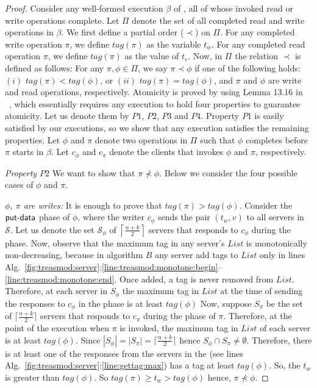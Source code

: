 			\begin{proof}
Consider any well-formed execution $\beta$ of \treasmod, all of whose invoked read or write operations complete. Let $\Pi$ denote the set of all completed read and write operations in $\beta$. We first define a partial order ($\prec$) on $\Pi$. 
For any completed write operation $\pi$, we define $tag(\pi)$ as the variable  $t_w$. For any completed read operation $\pi$, we define $tag(\pi)$ as the value of $t_r$. 
Now, in $\Pi$ the relation $\prec$ is defined as follows: For any $\pi, \phi \in \Pi$, we say $\pi \prec \phi$  if 
one of the following holds: $(i)$  $tag(\pi)  < tag(\phi)$, or $(ii)$ $tag(\pi) = tag(\phi)$, and  $\pi$ and $\phi$ are write and read 
operations, respectively. Atomicity is proved by using 
Lemma 13.16 in ~\cite{Lynch1996}, which essentially requires any execution to hold four properties to guarantee atomicity. Let us denote them by $P1$, $P2$, $P3$ and $P4$. Property $P1$ is easily satisfied by our executions, so we show that any execution satisfies the  remaining properties. Let $\phi$ and $\pi$ denote two operations in $\Pi$ such that $\phi$ completes before $\pi$ starts in $\beta$.  Let  $c_{\phi}$ and $c_{\pi}$ denote the clients that invokes $\phi$ and $\pi$, respectively. 

\emph{Property $P2$} We want to show that $\pi \not\prec \phi$. Below we consider the four possible cases of $\phi$ and $\pi$.

\emph{ $\phi$, $\pi$ are writes:} It is enough to prove that $tag(\pi) > tag(\phi)$. Consider the $\act{put-data}$ phase of $\phi$, where the writer $c_{\phi}$  sends the pair $(t_w, v)$ to all 
servers in $\mathcal{S}$. Let us denote the  set $\mathcal{S}_{\phi}$ of $\left\lceil \frac{n+k}{2} \right\rceil$ servers  that responds to $c_{\phi}$ during the  phase.  
Now, observe that the maximum tag in any server's $List$ is monotonically non-decreasing, because in algorithm $B$  
any server add tags to  $List$  only in lines 
Alg.~\ref{fig:treasmod:server}:\ref{line:treasmod:monotone:begin}--\ref{line:treasmod:monotone:end}.  Once added, a tag is never removed from $List$.
Therefore, at  each server in $S_{\phi}$ the maximum tag in $List$ at the time of 
sending the responses to $c_{\phi}$ in the   phase is at least $tag(\phi)$ 
 Now, suppose $S_{\pi}$ be 
the set of $\lceil \frac{n+k}{2} \rceil$ servers that responds to $c_{\pi}$ during the  phase of $\pi$. 
 Therefore, at the point of the execution when $\pi$ is invoked, the maximum
tag in  $List$ of each server is at least $tag(\phi)$. Since $|S_{\phi}| = | S_{\pi}| = \lceil \frac{n+k}{2} \rceil$  hence 
$S_{\phi} \cap S_{\pi} \neq \emptyset $. Therefore, there is at least one of the  responses from the servers in the 
(see lines Alg.~\ref{fig:treasmod:server}:\ref{line:gettag:max}) has a tag at least $tag(\phi)$. So, the $t_w$ is greater than $tag(\phi)$. So $tag(\pi) \geq t_w > tag(\phi)$ hence, $\pi \not\prec \phi$.
 

\end{proof}
